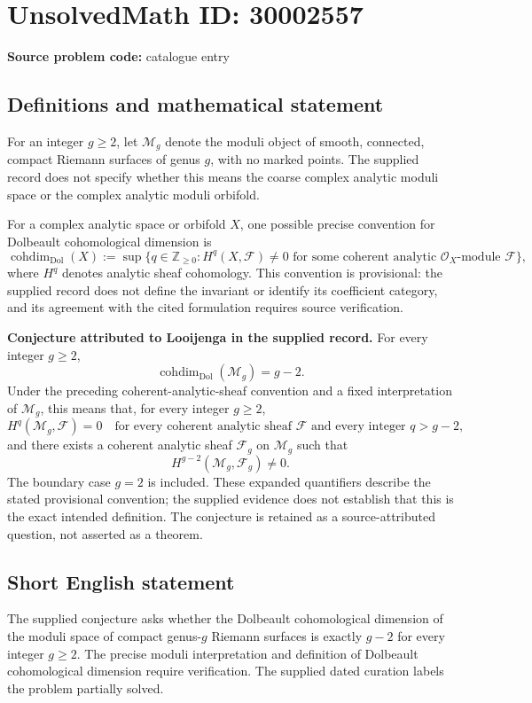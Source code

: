 \documentclass[11pt]{article}
\newcommand{\Z}{\mathbb{Z}}
\begin{document}
\section*{UnsolvedMath ID: 30002557}
\textbf{Source problem code:} catalogue entry
\subsection{Definitions and mathematical statement}
For an integer \(g\geq 2\), let \(\mathcal M_g\) denote the moduli object of smooth, connected, compact Riemann surfaces of genus \(g\), with no marked points. The supplied record does not specify whether this means the coarse complex analytic moduli space or the complex analytic moduli orbifold.

For a complex analytic space or orbifold \(X\), one possible precise convention for Dolbeault cohomological dimension is
\[
\operatorname{cohdim}_{\mathrm{Dol}}(X)
:=\sup\bigl\{q\in\Z_{\geq0}: H^q(X,\mathcal F)\neq0
\text{ for some coherent analytic }\mathcal O_X\text{-module }\mathcal F\bigr\},
\]
where \(H^q\) denotes analytic sheaf cohomology. This convention is provisional: the supplied record does not define the invariant or identify its coefficient category, and its agreement with the cited formulation requires source verification.

\textbf{Conjecture attributed to Looijenga in the supplied record.} For every integer \(g\geq2\),
\[
\operatorname{cohdim}_{\mathrm{Dol}}(\mathcal M_g)=g-2.
\]
Under the preceding coherent-analytic-sheaf convention and a fixed interpretation of \(\mathcal M_g\), this means that, for every integer \(g\geq2\),
\[
H^q(\mathcal M_g,\mathcal F)=0
\quad\text{for every coherent analytic sheaf }\mathcal F
\text{ and every integer }q>g-2,
\]
and there exists a coherent analytic sheaf \(\mathcal F_g\) on \(\mathcal M_g\) such that
\[
H^{g-2}(\mathcal M_g,\mathcal F_g)\neq0.
\]
The boundary case \(g=2\) is included. These expanded quantifiers describe the stated provisional convention; the supplied evidence does not establish that this is the exact intended definition. The conjecture is retained as a source-attributed question, not asserted as a theorem.
\subsection{Short English statement}
The supplied conjecture asks whether the Dolbeault cohomological dimension of the moduli space of compact genus-\(g\) Riemann surfaces is exactly \(g-2\) for every integer \(g\geq2\). The precise moduli interpretation and definition of Dolbeault cohomological dimension require verification. The supplied dated curation labels the problem partially solved.
\end{document}
